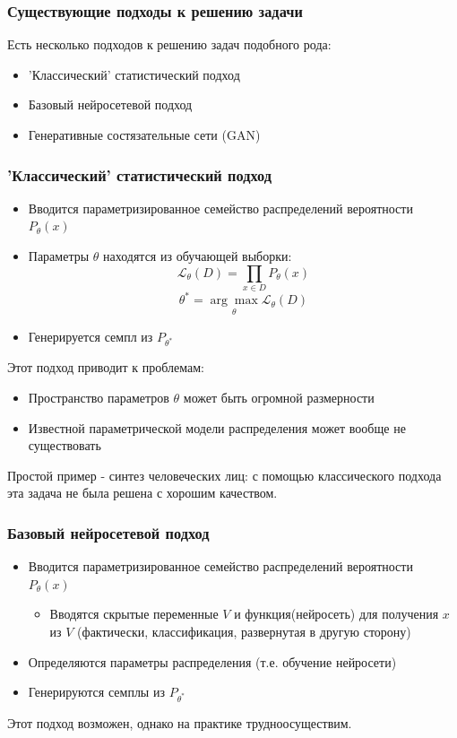 \documentclass[9pt]{beamer}
\begin{document}
\begin{frame}\frametitle{Существующие подходы к решению задачи}
	Есть несколько подходов к решению задач подобного рода:
	\begin{itemize}
		\item 'Классический' статистический подход
		\item Базовый нейросетевой подход
		\item Генеративные состязательные сети (GAN)
	\end{itemize}
\end{frame}

\begin{frame}\frametitle{'Классический' статистический подход}
	\begin{itemize}
		\item Вводится параметризированное семейство распределений вероятности $P_{\theta}(x)$
		\item Параметры $\theta$ находятся из обучающей выборки:
		$$ \mathcal{L}_{\theta}(D) = \prod_{x \in D} P_{\theta}(x) $$
		$$ \theta^{*} = \underset{\theta}{\arg\max} \mathcal{L}_{\theta}(D)$$
		\item Генерируется семпл из $ P_{\theta^{*}}$
	\end{itemize}
	Этот подход приводит к проблемам:
	\begin{itemize}
		\item Пространство параметров $\theta$ может быть огромной размерности
		\item Известной параметрической модели распределения может вообще не существовать
	\end{itemize}
	Простой пример - синтез человеческих лиц: с помощью классического подхода эта задача не была решена с хорошим качеством.
\end{frame}

\begin{frame}\frametitle{Базовый нейросетевой подход}
	\begin{itemize}
		\item Вводится параметризированное семейство распределений вероятности $P_{\theta}(x)$
		\begin{itemize}
			\item Вводятся скрытые переменные $V$ и функция(нейросеть) для получения $x$ из $V$ (фактически, классификация, развернутая в другую сторону)
		\end{itemize}
		\item Определяются параметры распределения (т.е. обучение нейросети)
		\item Генерируются семплы из $ P_{\theta^{*}}$
	\end{itemize}
	Этот подход возможен, однако на практике трудноосуществим.
\end{frame}
\end{document}
